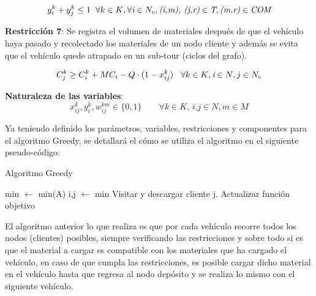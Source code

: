 \documentclass[conference]{IEEEtran}
\begin{document}
    \begin{equation}
             y^{k}_{i} + y^{k}_{j} \leq 1 \hspace{0.2cm} \forall \textit{$k$} \in \textit{$K$}, \forall \textit{i} \in \textit{$N_c$}, 
           \textit{(i,m), (j,r)} \in \textit{T}, \textit{(m,r)} \in \textit{COM} 
    \end{equation}

\textbf{Restricci\'on 7}: Se registra el volumen de materiales despu\'es de que el veh\'iculo haya pasado y recolectado los materiales de un nodo cliente y adem\'as se evita que el veh\'iculo quede atrapado en un sub-tour (ciclos del grafo).

    \begin{equation}
             C^{k}_{j} \geq C^{k}_{i} + MC_{i} - Q \cdot (1 - x^k_{ij}) \hspace{0.3cm} \forall \textit{$k$} \in \textit{$K$}, \textit{i} \in \textit{$N$}, 
          \textit{$j$} \in \textit{$N_c$}
    \end{equation}
    
\textbf{Naturaleza de las variables}: 
    \begin{equation}
            x^k_{ij}, y^k_i, w^{km}_{ij} \in \{0,1\} \qquad
            \forall \textit{$k$} \in \textit{$K$}
            \textit{, i,j} \in \textit{$N$}, \textit{$m$} \in \textit{$M$}
    \end{equation}

Ya teniendo definido los par\'ametros, variables, restricciones y componentes para el algoritmo Greedy, se detallar\'a el c\'omo se utiliza el algoritmo en el siguiente pseudo-c\'odigo:

\begin{algorithm}
\caption{Algoritmo Greedy}
\begin{algorithmic}[1]
        \STATE min $\gets$ min(A)
        \STATE i,j $\gets$ min
                \STATE Visitar y descargar cliente j.
                \STATE Actualizar funci\'on objetivo
            \ENDIF
        \ENDIF
    \ENDFOR
\ENDWHILE
\end{algorithmic}
\end{algorithm}

El algoritmo anterior lo que realiza es que por cada veh\'iculo recorre todos los nodos (clientes) posibles, siempre verificando las restricciones y sobre todo si es que el material a cargar es compatible con los materiales que ha cargado el veh\'iculo, en caso de que cumpla las restricciones, es posible cargar dicho material en el veh\'iculo hasta que regresa al nodo dep\'osito y se realiza lo mismo con el siguiente veh\'iculo.
\end{document}
